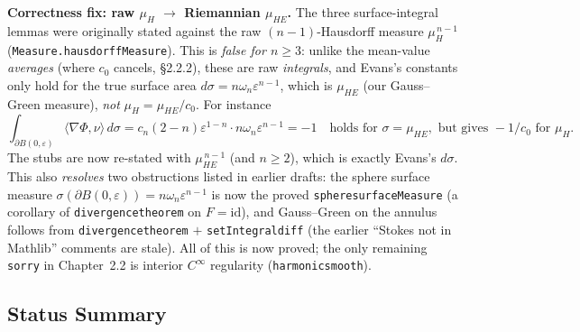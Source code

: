 ﻿\documentclass[12pt, a4paper]{article}
\renewcommand{\_}{\origunderscore\allowbreak}
\theoremstyle{definition}
\theoremstyle{plain}
\begin{document}
\textbf{Correctness fix: raw $\mu_H$ $\to$ Riemannian $\mu_{HE}$.} The three surface-integral
lemmas were originally stated against the raw $(n-1)$-Hausdorff measure
$\mu_H^{\,n-1}$ (\texttt{Measure.hausdorffMeasure}). This is \emph{false for $n \ge 3$}: unlike the
mean-value \emph{averages} (where $c_0$ cancels, §2.2.2), these are raw \emph{integrals}, and Evans's
constants only hold for the true surface area $d\sigma = n\omega_n\varepsilon^{n-1}$, which is
$\mu_{HE}$ (our Gauss--Green measure), \emph{not} $\mu_H = \mu_{HE}/c_0$. For instance
\[
\int_{\partial B(0,\varepsilon)} \langle\nabla\Phi,\nu\rangle\,d\sigma
= c_n(2-n)\varepsilon^{1-n}\cdot n\omega_n\varepsilon^{n-1} = -1
\quad\text{holds for } \sigma = \mu_{HE}, \text{ but gives } -1/c_0 \text{ for } \mu_H.
\]
The stubs are now re-stated with $\mu_{HE}^{\,n-1}$ (and $n \ge 2$), which is exactly Evans's
$d\sigma$. This also \emph{resolves} two obstructions listed in earlier drafts: the sphere surface
measure $\sigma(\partial B(0,\varepsilon)) = n\omega_n\varepsilon^{n-1}$ is now the proved
\texttt{sphere\_surfaceMeasure} (a corollary of \texttt{divergence\_theorem} on $F = \mathrm{id}$),
and Gauss--Green on the annulus follows from \texttt{divergence\_theorem} $+$ \texttt{setIntegral\_diff}
(the earlier ``Stokes not in Mathlib'' comments are stale). All of this is now proved; the only
remaining \texttt{sorry} in Chapter~2.2 is interior $C^\infty$ regularity
(\texttt{harmonic\_smooth}).

\subsection{Status Summary}
\end{document}
